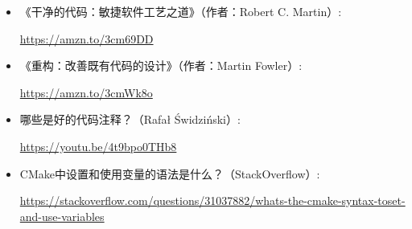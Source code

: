 
\begin{itemize}
\item
《干净的代码：敏捷软件工艺之道》（作者：Robert C. Martin）:

\url{https://amzn.to/3cm69DD}

\item
《重构：改善既有代码的设计》（作者：Martin Fowler）:

\url{https://amzn.to/3cmWk8o}

\item
哪些是好的代码注释？（Rafał Świdziński）:

\url{https://youtu.be/4t9bpo0THb8}

\item
CMake中设置和使用变量的语法是什么？（StackOverflow）:

\url{https://stackoverflow.com/questions/31037882/whats-the-cmake-syntax-toset-and-use-variables}
\end{itemize}





















